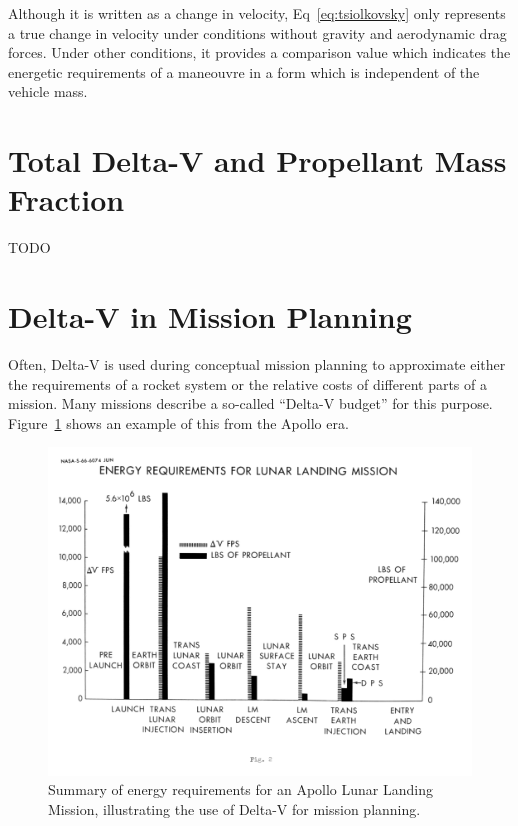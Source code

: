 \documentclass[12pt,openany]{book}
\begin{document}
Although it is written as a change in velocity, Eq~\ref{eq:tsiolkovsky} only represents a true change in velocity under conditions without gravity and aerodynamic drag forces. Under other conditions, it provides a comparison value which indicates the energetic requirements of a maneouvre in a form which is independent of the vehicle mass.

\section{Total Delta-V and Propellant Mass Fraction}

TODO

\section{Delta-V in Mission Planning}

Often, Delta-V is used during conceptual mission planning to approximate either the requirements of a rocket system or the relative costs of different parts of a mission. Many missions describe a so-called ``Delta-V budget'' for this purpose. Figure~\ref{fig:apollo-delta-v} shows an example of this from the Apollo era.
\begin{figure}
  \centering
  \includegraphics[width=\textwidth]{images/apollo-delta-v.png}
  \caption{Summary of energy requirements for an Apollo Lunar Landing Mission, illustrating the use of Delta-V for mission planning.\cite{maynard1966}}
  \label{fig:apollo-delta-v}
\end{figure}
\end{document}
